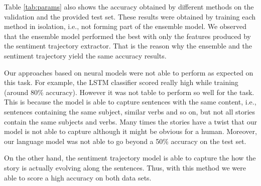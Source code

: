 \documentclass{article}
\newcommand{\lstm}{LSTM }
\begin{document}
Table \ref{tab:params} also shows the accuracy obtained by different methods on
the validation and the provided test set. These results were obtained by
training each method in isolation, i.e., not forming part of the ensemble model.
We observed that the ensemble model performed the best with only the features
produced by the sentiment trajectory extractor. That is the reason why the
ensemble and the sentiment trajectory yield the same accuracy results.



Our approaches based on neural models were not able to perform as expected on
this task. For example, the \lstm classifier scored really high while training
(around 80\% accuracy). However it was not table to perform so well for the
task. This is because the model is able to capture sentences with the same
content, i.e., sentences containing the same subject, similar verbs and so on,
but not all stories contain the same subjects and verbs. Many times the stories
have a twist that our model is not able to capture although it might be obvious
for a human. Moreover, our language model was not able to go beyond a 50\%
accuracy on the test set. 

On the other hand, the sentiment trajectory model is able to capture the how the
story is actually evolving along the sentences. Thus, with this method we were
able to score a high accuracy on both data sets.
\end{document}
